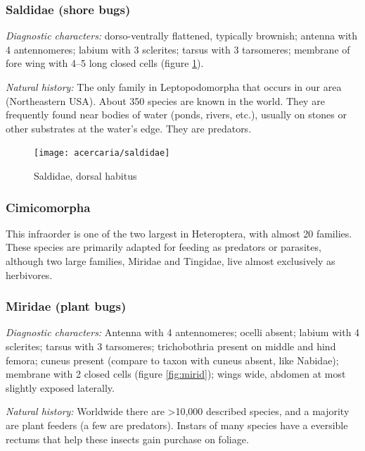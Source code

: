 \subsubsection{Saldidae (shore bugs)}
\noindent{}\textit{Diagnostic characters:} dorso-ventrally flattened, typically brownish; antenna with 4 antennomeres; labium with 3 sclerites; tarsus with 3 tarsomeres; membrane of fore wing with 4--5 long closed cells (figure \ref{fig:saldids}).\vspace{3mm}

\noindent{}\textit{Natural history:} The only family in Leptopodomorpha that occurs in our area (Northeastern USA). About 350 species are known in the world. They are frequently found near bodies of water (ponds, rivers, etc.), usually on stones or other substrates at the water's edge. They are predators.\vspace{3mm}

\begin{figure}[ht!]
 \centering
 \texttt{[image: acercaria/saldidae]}
 \caption{Saldidae, dorsal habitus \citep[][Fig. 7:40b]{bhlitem126080aquatic}}
 \label{fig:saldids}
\end{figure}

\subsubsection{Cimicomorpha}
This infraorder is one of the two largest in Heteroptera, with almost 20 families. These species are primarily adapted for feeding as predators or parasites, although two large families, Miridae and Tingidae, live almost exclusively as herbivores.
\subsubsection{Miridae (plant bugs)}
\noindent{}\textit{Diagnostic characters:} Antenna with 4 antennomeres; ocelli absent; labium with 4 sclerites; tarsus with 3 tarsomeres; trichobothria present on middle and hind femora; cuneus present (compare to taxon with cuneus absent, like Nabidae); membrane with 2 closed cells (figure \ref{fig:mirid}); wings wide, abdomen at most slightly exposed laterally.\vspace{3mm}

\noindent{}\textit{Natural history:} Worldwide there are \textgreater10,000 described species, and a majority are plant feeders (a few are predators). Instars of many species have a eversible rectums that help these insects gain purchase on foliage.\vspace{3mm}


